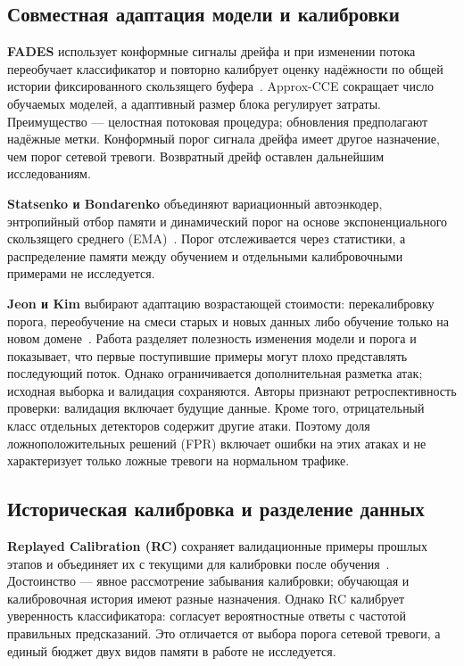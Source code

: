 \subsection{Совместная адаптация модели и калибровки}
\label{subsec:related_joint}

\textbf{FADES} использует конформные сигналы дрейфа и при изменении
потока переобучает классификатор и повторно калибрует оценку
надёжности по общей истории фиксированного скользящего
буфера~\cite{FADES2026}. Approx-CCE сокращает число обучаемых
моделей, а адаптивный размер блока регулирует затраты.
Преимущество --- целостная потоковая процедура; обновления
предполагают надёжные метки. Конформный порог сигнала дрейфа
имеет другое назначение, чем порог сетевой тревоги.
Возвратный дрейф оставлен дальнейшим исследованиям.

\textbf{Statsenko и Bondarenko} объединяют вариационный автоэнкодер,
энтропийный отбор памяти и динамический порог на основе
экспоненциального скользящего среднего (EMA)~\cite{EntropyThreshold2025}.
Порог отслеживается через статистики, а распределение памяти между обучением
и отдельными калибровочными примерами не исследуется.

\textbf{Jeon и Kim} выбирают адаптацию возрастающей стоимости:
перекалибровку порога, переобучение на смеси старых и новых
данных либо обучение только на новом домене~\cite{LabelEfficient2026}.
Работа разделяет полезность изменения модели и порога и показывает,
что первые поступившие примеры могут плохо представлять
последующий поток. Однако ограничивается дополнительная
разметка атак; исходная выборка и валидация сохраняются.
Авторы признают ретроспективность проверки: валидация включает
будущие данные. Кроме того, отрицательный класс отдельных
детекторов содержит другие атаки. Поэтому доля ложноположительных
решений (FPR) включает ошибки на этих атаках и не характеризует
только ложные тревоги на нормальном трафике.

\subsection{Историческая калибровка и разделение данных}
\label{subsec:related_splitting}

\textbf{Replayed Calibration (RC)} сохраняет валидационные примеры
прошлых этапов и объединяет их с текущими для калибровки после
обучения~\cite{RC2024}. Достоинство --- явное рассмотрение
забывания калибровки; обучающая и калибровочная история имеют
разные назначения. Однако RC калибрует уверенность классификатора:
согласует вероятностные ответы с частотой правильных предсказаний.
Это отличается от выбора порога сетевой тревоги, а единый бюджет
двух видов памяти в работе не исследуется.

